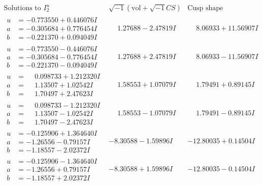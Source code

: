 \documentclass[1p]{elsarticle_modified}
\theoremstyle{definition}
\newcommand{\I}{\sqrt{-1}}
\begin{document}
$$\begin{array}{c|c|c}  
\text{Solutions to }I^u_{2}& \I (\text{vol} + \sqrt{-1}CS) & \text{Cusp shape}\\
 \hline 
\begin{aligned}
u &= -0.773550 + 0.446076 I \\
a &= -0.305684 + 0.776454 I \\
b &= -0.221370 + 0.094049 I\end{aligned}
 & \phantom{-}1.27688 - 2.47819 I & \phantom{-}8.06933 + 11.56907 I \\ \hline\begin{aligned}
u &= -0.773550 - 0.446076 I \\
a &= -0.305684 - 0.776454 I \\
b &= -0.221370 - 0.094049 I\end{aligned}
 & \phantom{-}1.27688 + 2.47819 I & \phantom{-}8.06933 - 11.56907 I \\ \hline\begin{aligned}
u &= \phantom{-}0.098733 + 1.212320 I \\
a &= \phantom{-}1.13507 + 1.02542 I \\
b &= \phantom{-}1.70497 + 2.47623 I\end{aligned}
 & \phantom{-}1.58553 + 1.07079 I & \phantom{-}1.79491 + 0.89145 I \\ \hline\begin{aligned}
u &= \phantom{-}0.098733 - 1.212320 I \\
a &= \phantom{-}1.13507 - 1.02542 I \\
b &= \phantom{-}1.70497 - 2.47623 I\end{aligned}
 & \phantom{-}1.58553 - 1.07079 I & \phantom{-}1.79491 - 0.89145 I \\ \hline\begin{aligned}
u &= -0.125906 + 1.364640 I \\
a &= -1.26556 - 0.79157 I \\
b &= -1.18557 - 2.02372 I\end{aligned}
 & -8.30588 - 1.59896 I & -12.80035 + 0.14504 I \\ \hline\begin{aligned}
u &= -0.125906 - 1.364640 I \\
a &= -1.26556 + 0.79157 I \\
b &= -1.18557 + 2.02372 I\end{aligned}
 & -8.30588 + 1.59896 I & -12.80035 - 0.14504 I \\ \hline\begin{aligned}

\end{aligned}
\end{array}$$
\end{document}
